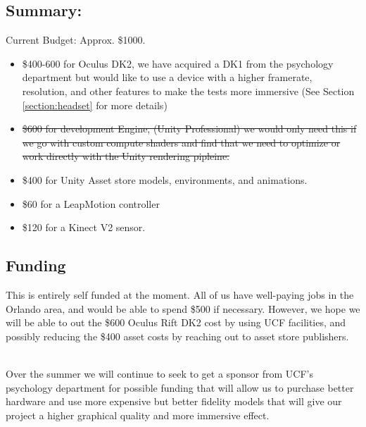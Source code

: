 \documentclass[a4paper,10pt]{article}
\begin{document}
\subsection{Summary:}
Current Budget: Approx. \$1000.  
\begin{itemize}
	\item \$400-600 for Oculus DK2, we have acquired a DK1 from the psychology department but would like to use a device with a higher framerate, resolution, and other features to make the tests more immersive (See Section \ref{section:headset} for more details)
	\item  \st{\$600 for development Engine, (Unity Professional) we would only need this if we go with custom compute shaders and find that we need to optimize or work directly with the Unity rendering pipleine.}
	\item	\$400 for Unity Asset store models, environments, and animations.
	\item  \$60 for a LeapMotion controller
	\item  \$120 for a Kinect V2 sensor. 
\end{itemize}

\subsection{Funding}
This is entirely self funded at the moment.  All of us have well-paying jobs in the Orlando area, and would be able to spend \$500 if necessary.  However, we hope we will be able to out the \$600 Oculus Rift DK2 cost by using UCF facilities, and possibly reducing the \$400 asset costs by reaching out to asset store publishers.

~\\ Over the summer we will continue to seek to get a sponsor from UCF's psychology department for possible funding that will allow us to purchase better hardware and use more expensive but better fidelity models that will give our project a higher graphical quality and more immersive effect.
			    
			    
\end{document}
